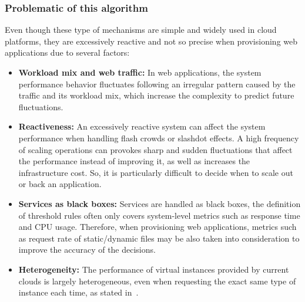 
\subsubsection{Problematic of this algorithm}

Even though these type of mechanisms are simple and widely used in cloud platforms, they are excessively reactive and not so precise when provisioning web applications due to several factors: 


\begin{itemize}
\item  \textbf{Workload mix and web traffic:} In web applications, the system performance behavior fluctuates following an irregular pattern caused by the traffic and its workload mix, which increase the complexity to predict future fluctuations. 


\item \textbf{Reactiveness:} An excessively reactive system can affect the system performance when handling flash crowds or slashdot effects. A high frequency of scaling operations can provokes sharp and sudden fluctuations that affect the performance instead of improving it, as well as increases the infrastructure cost. So, it is particularly difficult to decide when to scale out or back an application. 

\item \textbf{Services as black boxes:} Services are handled as black boxes, the definition of threshold rules often only covers system-level metrics such as response time and CPU usage. Therefore, when provisioning web applications, metrics such as request rate of static/dynamic files may be also taken into consideration to improve the accuracy of the decisions.



\item  \textbf{Heterogeneity:} The performance of virtual instances provided by current clouds is largely heterogeneous, even when requesting the exact same type of instance each time, as stated in~\cite{ec2Performance}. 


\end{itemize}


